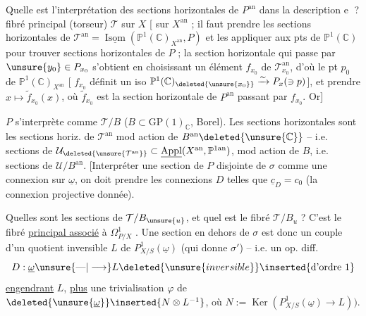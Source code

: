 Quelle est l'interprétation des sections horizontales  de $P^{\mathrm{an}}$ dans la description \textcircled{e} ?  fibré principal (torseur) $\mathcal T$ sur $X$ [ sur $X^{\mathrm{an}}$ ; il faut prendre les sections horizontales de $\mathcal T^{\mathrm{an}}=\underline{\operatorname{Isom}}(\mathbb P^1(\mathbb C)_{X^{\mathrm{an}}},P)$ et les appliquer aux pts de $\mathbb P^1(\mathbb C)$ pour trouver sections horizontales de $P$ ; la section horizontale qui passe par $\unsure{y_0}\in P_{x_0}$ s'obtient en choisissant un  élément $f_{x_0}$ de $\mathcal T_{x_0}^{\mathrm{an}}$, d'où  le pt $p_0$ de $\mathbb P^1(\mathbb C)_{X^{\mathrm{an}}}$ [ $f_{x_0}$ définit un iso $\mathbb P^1(\mathbb C)_{\deleted{\unsure{x_0}}}\xrightarrow{\sim}P_x(\ni p)$], et prendre $x\mapsto\widetilde f_{x_0}(x)$, où $\widetilde f_{x_0}$ est la section horizontale  de $P^{\mathrm{an}}$ passant par $f_{x_0}$. Or]

$P$ s'interprète comme $\mathcal T/B$ ($B\subset\mathrm{GP}(1)_{\mathbb C}$, Borel). Les sections  horizontales  sont les sections horiz. de $\mathcal T^{\mathrm{an}}$ mod action de $B^{\mathrm{an}}\deleted{\unsure{\mathbb C}}$ -- i.e. sections de $\mathcal U_{\deleted{\unsure{\mathcal T^{\mathrm{an}}}}}\subset\underline{\operatorname{Appl}}(X^{\mathrm{an}},\mathbb P^{1\mathrm{an}})$, mod action de $B$, i.e. sections de $\mathcal U/B^{\mathrm{an}}$. [Interpréter une section de $P$ disjointe de $\sigma$ comme une connexion  sur $\underline\omega$,  on doit prendre les connexions $D$ telles que $\underline c_D=c_0$ (la connexion projective donnée).

Quelles sont les sections  de $\mathcal T/B_{\unsure{u}}$, et quel est
le fibré $\mathcal T/B_u$  ? C'est le fibré \uline{principal associé} à $\Omega^1_{P/X}$ . Une section en dehors de $\sigma$ est donc  un couple d'un quotient inversible $L$ de $P^1_{X/S}(\underline\omega)$ (qui donne $\sigma'$) -- i.e. un op. diff.
\[
D:\underline\omega\unsure{\text{---}|\longrightarrow}L\deleted{\unsure{inversible}}\inserted{\text{d'ordre 1}}
\]
\uline{engendrant} $L$, \uline{plus} une trivialisation $\varphi$ de $\deleted{\unsure{\underline\omega}}\inserted{N\otimes L^{-1}}$, où $N:=\operatorname{Ker}(P^1_{X/S}(\underline\omega)\longrightarrow L))$.


